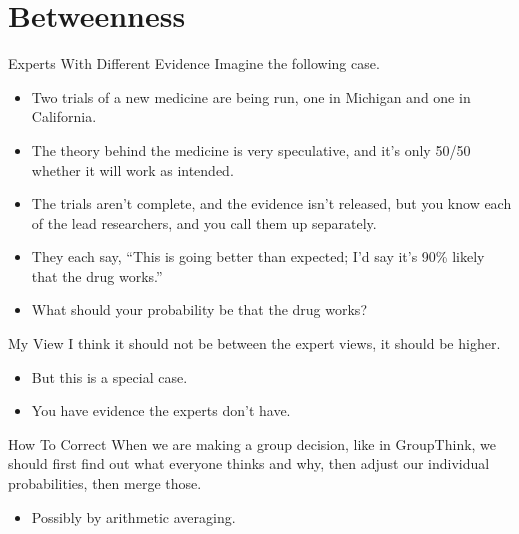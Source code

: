 \documentclass[
  ignorenonframetext,
]{beamer}
\providecommand{\tightlist}{%
  \setlength{\itemsep}{0pt}\setlength{\parskip}{0pt}}
\begin{document}
\hypertarget{betweenness}{%
\section{Betweenness}\label{betweenness}}

\begin{frame}{Experts With Different Evidence}
\protect\hypertarget{experts-with-different-evidence}{}
Imagine the following case.

\begin{itemize}
\tightlist
\item
  Two trials of a new medicine are being run, one in Michigan and one in
  California.
\item
  The theory behind the medicine is very speculative, and it's only
  50/50 whether it will work as intended.
\item
  The trials aren't complete, and the evidence isn't released, but you
  know each of the lead researchers, and you call them up separately.
\item
  They each say, ``This is going better than expected; I'd say it's 90\%
  likely that the drug works.''
\item
  What should your probability be that the drug works?
\end{itemize}
\end{frame}

\begin{frame}{My View}
\protect\hypertarget{my-view}{}
I think it should not be between the expert views, it should be higher.

\begin{itemize}
\tightlist
\item
  But this is a special case.
\item
  You have evidence the experts don't have.
\end{itemize}
\end{frame}

\begin{frame}{How To Correct}
\protect\hypertarget{how-to-correct}{}
When we are making a group decision, like in GroupThink, we should first
find out what everyone thinks and why, then adjust our individual
probabilities, then merge those.

\begin{itemize}
\tightlist
\item
  Possibly by arithmetic averaging.
\end{itemize}
\end{frame}
\end{document}
